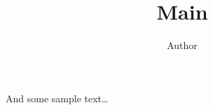 \documentclass{article}
\title{Main}
\author{Author}
\begin{document}
\maketitle

And some sample text\ldots
\end{document}
